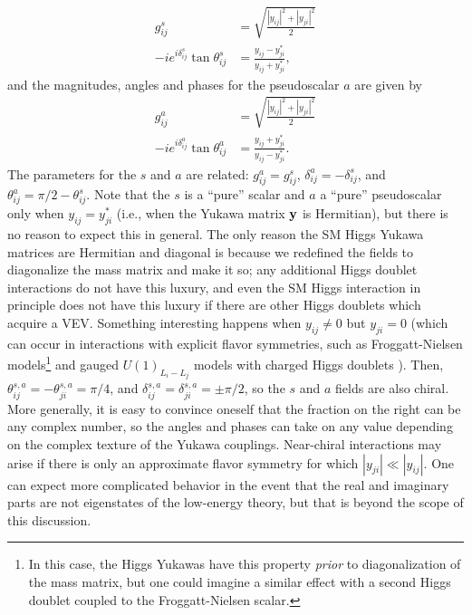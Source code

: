 \begin{align}
    g_{ij}^s &= \sqrt{\frac{|y_{ij}|^2 + |y_{ji}|^2}{2}}\\
    -ie^{i\delta_{ij}^s}\tan{\theta_{ij}^s} &= \frac{y_{ij} - y_{ji}^*}{y_{ij} + y_{ji}^*},
\end{align}
and the magnitudes, angles and phases for the pseudoscalar $a$ are given by
\begin{align}
    g_{ij}^a &= \sqrt{\frac{|y_{ij}|^2 + |y_{ji}|^2}{2}}\\
    -ie^{i\delta_{ij}^a}\tan{\theta_{ij}^a} &= \frac{y_{ij} + y_{ji}^*}{y_{ij} - y_{ji}^*}.
\end{align}
The parameters for the $s$ and $a$ are related: $g_{ij}^a = g_{ij}^s$, $\delta_{ij}^a = - \delta_{ij}^s$, and $\theta_{ij}^a = \pi/2 - \theta_{ij}^s$. Note that the $s$ is a ``pure'' scalar and $a$ a ``pure'' pseudoscalar only  when $y_{ij} = y_{ji}^*$ (i.e., when the Yukawa matrix ${\bf y}$ is Hermitian), but there is no reason to expect this in general. The only reason the SM Higgs Yukawa matrices are Hermitian and diagonal is because we redefined the fields to diagonalize the mass matrix and make it so; any additional Higgs doublet interactions do not have this luxury, and even the SM Higgs interaction in principle does not have this luxury if there are other Higgs doublets which acquire a VEV. Something interesting happens when $y_{ij} \neq 0$ but $y_{ji} = 0$ (which can occur in interactions with explicit flavor symmetries, such as  Froggatt-Nielsen models\footnote{In this case, the Higgs Yukawas have this property {\it prior} to diagonalization of the mass matrix, but one could imagine a similar effect with a second Higgs doublet coupled to the Froggatt-Nielsen scalar.}\cite{Froggatt:1978nt,Greljo:2024evt} and gauged $U(1)_{L_i - L_j}$ models with charged Higgs doublets \cite{Heeck:2011wj}). Then, $\theta_{ij}^{s,a} = -\theta_{ji}^{s, a} = \pi/4$, and $\delta_{ij}^{s,a} = \delta_{ji}^{s,a} =\pm\pi/2$, so the $s$ and $a$ fields are also chiral. More generally, it is easy to convince oneself that the fraction on the right can be any complex number, so the angles and phases can take on any value depending on the complex texture of the Yukawa couplings. Near-chiral interactions may arise if there is only an approximate flavor symmetry for which $|y_{ji}|\ll |y_{ij}|$. One can expect more complicated behavior in the event that the real and imaginary parts are not eigenstates of the low-energy theory, but that is beyond the scope of this discussion. 

